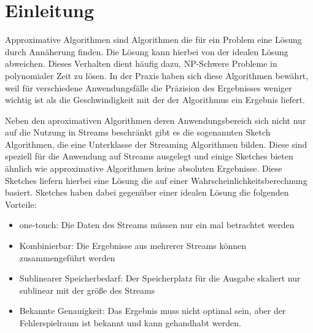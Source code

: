 \section{Einleitung}
Approximative Algorithmen sind Algorithmen die für ein Problem eine Lösung durch Annäherung finden. Die Lösung kann hierbei von der idealen Lösung abweichen. Dieses Verhalten dient häufig dazu, NP-Schwere Probleme in polynomialer Zeit zu lösen.
In der Praxis haben sich diese Algorithmen bewährt, weil für verschiedene Anwendungsfälle die Präzision des Ergebnisses weniger wichtig ist als die Geschwindigkeit mit der der Algorithmus ein Ergebnis liefert.


Neben den aproximativen Algorithmen deren Anwendungsbereich sich nicht nur auf die Nutzung in Streams beschränkt gibt es die sogenannten Sketch Algorithmen, die eine Unterklasse der Streaming Algorithmen bilden. Diese sind speziell für die Anwendung auf Streams ausgelegt und einige Sketches bieten ähnlich wie approximative Algorithmen keine absoluten Ergebnisse. Diese Sketches liefern hierbei eine Lösung die auf einer Wahrscheinlichkeitsberechnung basiert.
Sketches haben dabei gegenüber einer idealen Lösung die folgenden Vorteile:
\begin{itemize}
\item one-touch: Die Daten des Streams müssen nur ein mal betrachtet werden
\item Kombinierbar: Die Ergebnisse aus mehrerer Streams können zusammengeführt werden
\item Sublinearer Speicherbedarf: Der Speicherplatz für die Ausgabe skaliert nur sublinear mit der größe des Streams
\item Bekannte Genauigkeit: Das Ergebnis muss nicht optimal sein, aber der Fehlerspielraum ist bekannt und kann gehandhabt werden.
\end{itemize}



